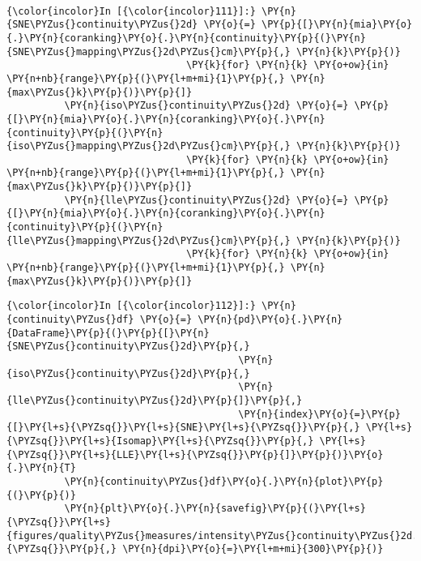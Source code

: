     \begin{center}
    \end{center}
    { \hspace*{\fill} \\}

    \begin{Verbatim}[commandchars=\\\{\}]
{\color{incolor}In [{\color{incolor}111}]:} \PY{n}{SNE\PYZus{}continuity\PYZus{}2d} \PY{o}{=} \PY{p}{[}\PY{n}{mia}\PY{o}{.}\PY{n}{coranking}\PY{o}{.}\PY{n}{continuity}\PY{p}{(}\PY{n}{SNE\PYZus{}mapping\PYZus{}2d\PYZus{}cm}\PY{p}{,} \PY{n}{k}\PY{p}{)}
                               \PY{k}{for} \PY{n}{k} \PY{o+ow}{in} \PY{n+nb}{range}\PY{p}{(}\PY{l+m+mi}{1}\PY{p}{,} \PY{n}{max\PYZus{}k}\PY{p}{)}\PY{p}{]}
          \PY{n}{iso\PYZus{}continuity\PYZus{}2d} \PY{o}{=} \PY{p}{[}\PY{n}{mia}\PY{o}{.}\PY{n}{coranking}\PY{o}{.}\PY{n}{continuity}\PY{p}{(}\PY{n}{iso\PYZus{}mapping\PYZus{}2d\PYZus{}cm}\PY{p}{,} \PY{n}{k}\PY{p}{)}
                               \PY{k}{for} \PY{n}{k} \PY{o+ow}{in} \PY{n+nb}{range}\PY{p}{(}\PY{l+m+mi}{1}\PY{p}{,} \PY{n}{max\PYZus{}k}\PY{p}{)}\PY{p}{]}
          \PY{n}{lle\PYZus{}continuity\PYZus{}2d} \PY{o}{=} \PY{p}{[}\PY{n}{mia}\PY{o}{.}\PY{n}{coranking}\PY{o}{.}\PY{n}{continuity}\PY{p}{(}\PY{n}{lle\PYZus{}mapping\PYZus{}2d\PYZus{}cm}\PY{p}{,} \PY{n}{k}\PY{p}{)}
                               \PY{k}{for} \PY{n}{k} \PY{o+ow}{in} \PY{n+nb}{range}\PY{p}{(}\PY{l+m+mi}{1}\PY{p}{,} \PY{n}{max\PYZus{}k}\PY{p}{)}\PY{p}{]}
\end{Verbatim}

    \begin{Verbatim}[commandchars=\\\{\}]
{\color{incolor}In [{\color{incolor}112}]:} \PY{n}{continuity\PYZus{}df} \PY{o}{=} \PY{n}{pd}\PY{o}{.}\PY{n}{DataFrame}\PY{p}{(}\PY{p}{[}\PY{n}{SNE\PYZus{}continuity\PYZus{}2d}\PY{p}{,}
                                        \PY{n}{iso\PYZus{}continuity\PYZus{}2d}\PY{p}{,}
                                        \PY{n}{lle\PYZus{}continuity\PYZus{}2d}\PY{p}{]}\PY{p}{,}
                                        \PY{n}{index}\PY{o}{=}\PY{p}{[}\PY{l+s}{\PYZsq{}}\PY{l+s}{SNE}\PY{l+s}{\PYZsq{}}\PY{p}{,} \PY{l+s}{\PYZsq{}}\PY{l+s}{Isomap}\PY{l+s}{\PYZsq{}}\PY{p}{,} \PY{l+s}{\PYZsq{}}\PY{l+s}{LLE}\PY{l+s}{\PYZsq{}}\PY{p}{]}\PY{p}{)}\PY{o}{.}\PY{n}{T}
          \PY{n}{continuity\PYZus{}df}\PY{o}{.}\PY{n}{plot}\PY{p}{(}\PY{p}{)}
          \PY{n}{plt}\PY{o}{.}\PY{n}{savefig}\PY{p}{(}\PY{l+s}{\PYZsq{}}\PY{l+s}{figures/quality\PYZus{}measures/intensity\PYZus{}continuity\PYZus{}2d.png}\PY{l+s}{\PYZsq{}}\PY{p}{,} \PY{n}{dpi}\PY{o}{=}\PY{l+m+mi}{300}\PY{p}{)}
\end{Verbatim}

